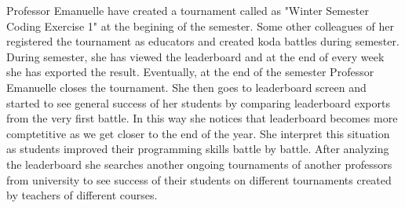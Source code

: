 \begin{enumerate}
    Professor Emanuelle have created a tournament called as "Winter Semester Coding Exercise 1" at the begining of the semester. Some other colleagues of her registered the tournament as educators and created koda battles during semester. During semester, she has viewed the leaderboard and at the end of every week she has exported the result. Eventually, at the end of the semester Professor Emanuelle closes the tournament. She then goes to leaderboard screen and started to see general success of her students by comparing leaderboard exports from the very first battle. In this way she notices that leaderboard becomes more comptetitive as we get closer to the end of the year. She interpret this situation as students improved their programming skills battle by battle. After analyzing the leaderboard she searches another ongoing tournaments of another professors from university to see success of their students on different tournaments created by teachers of different courses.
    
\end{enumerate}
\newpage
